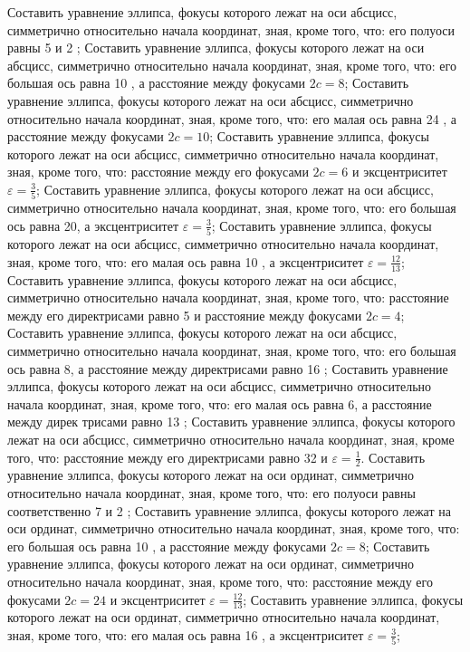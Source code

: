 Составить уравнение эллипса, фокусы которого лежат на оси абсцисс, симметрично относительно начала координат, зная, кроме того, что: его полуоси равны 5 и 2 ;
Составить уравнение эллипса, фокусы которого лежат на оси абсцисс, симметрично относительно начала координат, зная, кроме того, что: его большая ось равна 10 , а расстояние между фокусами $2 c=8$;
Составить уравнение эллипса, фокусы которого лежат на оси абсцисс, симметрично относительно начала координат, зная, кроме того, что: его малая ось равна 24 , а расстояние между фокусами $2 c=10$;
Составить уравнение эллипса, фокусы которого лежат на оси абсцисс, симметрично относительно начала координат, зная, кроме того, что: расстояние между его фокусами $2 c=6$ и эксцентриситет $\varepsilon=\frac{3}{5}$;
Составить уравнение эллипса, фокусы которого лежат на оси абсцисс, симметрично относительно начала координат, зная, кроме того, что: его большая ось равна 20, а эксцентриситет $\varepsilon=\frac{3}{5}$;
Составить уравнение эллипса, фокусы которого лежат на оси абсцисс, симметрично относительно начала координат, зная, кроме того, что: его малая ось равна 10 , а эксцентриситет $\varepsilon=\frac{12}{13}$;
Составить уравнение эллипса, фокусы которого лежат на оси абсцисс, симметрично относительно начала координат, зная, кроме того, что: расстояние между его директрисами равно 5 и расстояние между фокусами $2 c=4$;
Составить уравнение эллипса, фокусы которого лежат на оси абсцисс, симметрично относительно начала координат, зная, кроме того, что: его большая ось равна 8, а расстояние между директрисами равно 16 ;
Составить уравнение эллипса, фокусы которого лежат на оси абсцисс, симметрично относительно начала координат, зная, кроме того, что: его малая ось равна 6, а расстояние между дирек трисами равно 13 ;
Составить уравнение эллипса, фокусы которого лежат на оси абсцисс, симметрично относительно начала координат, зная, кроме того, что: расстояние между его директрисами равно 32 и $\varepsilon=\frac{1}{2}$.
Составить уравнение эллипса, фокусы которого лежат на оси ординат, симметрично относительно начала координат, зная, кроме того, что: его полуоси равны соответственно 7 и 2 ;
Составить уравнение эллипса, фокусы которого лежат на оси ординат, симметрично относительно начала координат, зная, кроме того, что: его большая ось равна 10 , а расстояние между фокусами $2 c=8$;
Составить уравнение эллипса, фокусы которого лежат на оси ординат, симметрично относительно начала координат, зная, кроме того, что: расстояние между его фокусами $2 c=24$ и эксцентриситет $\varepsilon=\frac{12}{13}$;
Составить уравнение эллипса, фокусы которого лежат на оси ординат, симметрично относительно начала координат, зная, кроме того, что: его малая ось равна 16 , а эксцентриситет $\varepsilon=\frac{3}{5}$;
